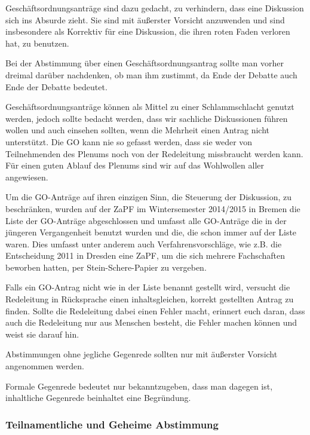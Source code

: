 \documentclass[
  a4paper,
  oneside]{scrartcl}
\begin{document}
Geschäftsordnungsanträge sind dazu gedacht, zu verhindern, dass eine
Diskussion sich ins Absurde zieht. Sie sind mit äußerster Vorsicht
anzuwenden und sind insbesondere als Korrektiv für eine Diskussion, die
ihren roten Faden verloren hat, zu benutzen.

Bei der Abstimmung über einen Geschäftsordnungsantrag sollte man vorher
dreimal darüber nachdenken, ob man ihm zustimmt, da Ende der Debatte
auch Ende der Debatte bedeutet.

Geschäftsordnungsanträge können als Mittel zu einer Schlammschlacht
genutzt werden, jedoch sollte bedacht werden, dass wir sachliche
Diskussionen führen wollen und auch einsehen sollten, wenn die Mehrheit
einen Antrag nicht unterstützt. Die GO kann nie so gefasst werden, dass
sie weder von Teilnehmenden des Plenums noch von der Redeleitung
missbraucht werden kann. Für einen guten Ablauf des Plenums sind wir auf
das Wohlwollen aller angewiesen.

Um die GO-Anträge auf ihren einzigen Sinn, die Steuerung der Diskussion,
zu beschränken, wurden auf der ZaPF im Wintersemester 2014/2015 in
Bremen die Liste der GO-Anträge abgeschlossen und umfasst alle
GO-Anträge die in der jüngeren Vergangenheit benutzt wurden und die, die
schon immer auf der Liste waren. Dies umfasst unter anderem auch
Verfahrensvorschläge, wie z.B. die Entscheidung 2011 in Dresden eine
ZaPF, um die sich mehrere Fachschaften beworben hatten, per
Stein-Schere-Papier zu vergeben.

Falls ein GO-Antrag nicht wie in der Liste benannt gestellt wird,
versucht die Redeleitung in Rücksprache einen inhaltsgleichen, korrekt
gestellten Antrag zu finden. Sollte die Redeleitung dabei einen Fehler
macht, erinnert euch daran, dass auch die Redeleitung nur aus Menschen
besteht, die Fehler machen können und weist sie darauf hin.

Abstimmungen ohne jegliche Gegenrede sollten nur mit äußerster Vorsicht
angenommen werden.

Formale Gegenrede bedeutet nur bekanntzugeben, dass man dagegen ist,
inhaltliche Gegenrede beinhaltet eine Begründung.

\subsubsection*{Teilnamentliche und Geheime Abstimmung}
\end{document}
